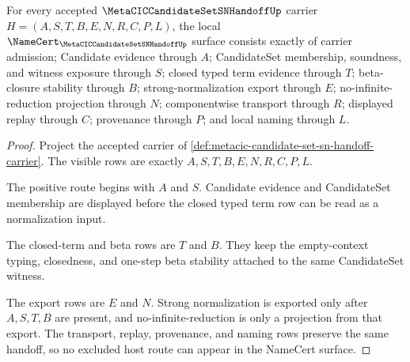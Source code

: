 \begin{theorem}
\label{thm:metacic-candidate-set-sn-handoff-obligations}
For every accepted $\MetaCICCandidateSetSNHandoffUp$ carrier $H=(A,S,T,B,E,N,R,C,P,L)$, the local $\NameCert_{\MetaCICCandidateSetSNHandoffUp}$ surface consists exactly of carrier admission; Candidate evidence through $A$; CandidateSet membership, soundness, and witness exposure through $S$; closed typed term evidence through $T$; beta-closure stability through $B$; strong-normalization export through $E$; no-infinite-reduction projection through $N$; componentwise transport through $R$; displayed replay through $C$; provenance through $P$; and local naming through $L$.
\end{theorem}
\begin{proof}
Project the accepted carrier of \autoref{def:metacic-candidate-set-sn-handoff-carrier}. The visible rows are exactly $A,S,T,B,E,N,R,C,P,L$.

The positive route begins with $A$ and $S$. Candidate evidence and CandidateSet membership are displayed before the closed typed term row can be read as a normalization input.

The closed-term and beta rows are $T$ and $B$. They keep the empty-context typing, closedness, and one-step beta stability attached to the same CandidateSet witness.

The export rows are $E$ and $N$. Strong normalization is exported only after $A,S,T,B$ are present, and no-infinite-reduction is only a projection from that export. The transport, replay, provenance, and naming rows preserve the same handoff, so no excluded host route can appear in the NameCert surface.
\end{proof}

